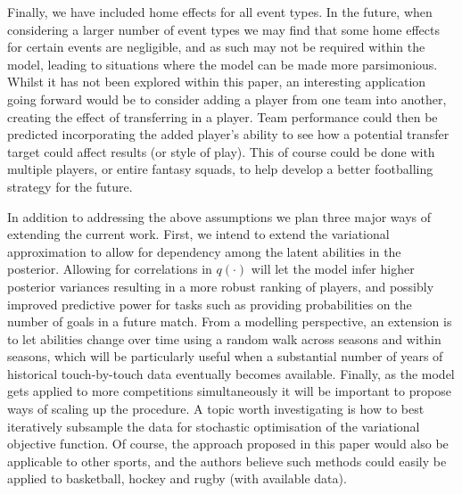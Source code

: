 \documentclass[11pt,a4paper]{article}
\begin{document}
Finally, we have included home effects for all event types. In the future, when 
considering a larger number of event types we may find that some home effects 
for certain events are negligible, and as such may not be required within the 
model, leading to situations where the model can be made more parsimonious. 
Whilst it has not been explored within this paper, an interesting application 
going forward would be to consider adding a player from one team into another, 
creating the effect of transferring in a player. Team performance could then be 
predicted incorporating the added player's ability to see how a potential 
transfer target could affect results (or style of play). This of course could be 
done with multiple players, or entire fantasy squads, to help develop a better 
footballing strategy for the future.

In addition to addressing the above assumptions we plan three major ways of 
extending the current work. First, we 
intend to extend the variational approximation to allow for dependency 
among the latent abilities in the posterior.  Allowing for correlations 
in $q(\cdot)$ will let the model infer higher posterior variances resulting 
in a more robust ranking of players, and possibly improved predictive 
power for tasks such as providing probabilities on the number of goals 
in a future match.  From a modelling perspective, an extension is to 
let abilities change over time using a random walk across seasons and 
within seasons, which will be particularly useful when a substantial 
number of years of historical touch-by-touch data eventually becomes 
available. Finally, as the model gets applied to more competitions 
simultaneously it will be important to propose ways of scaling up 
the procedure. A topic worth investigating is how to best iteratively 
subsample the data for stochastic optimisation of the variational 
objective function. Of course, the approach proposed in this paper 
would also be applicable to other sports, and the authors believe such 
methods could easily be applied to basketball, hockey and rugby (with 
available data).
\end{document}
